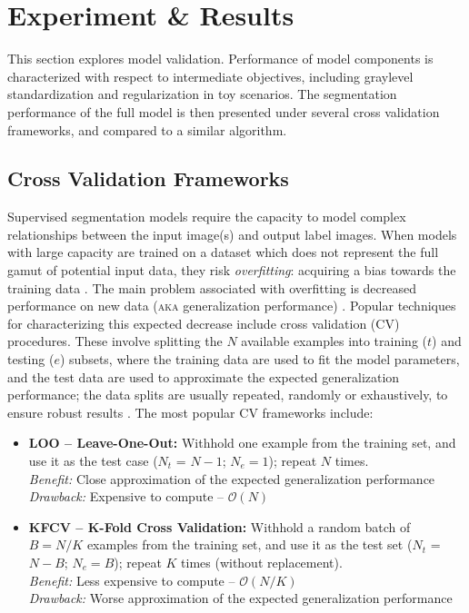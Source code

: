 \chapter{Experiment \& Results}
This section explores model validation.
Performance of model components is characterized with respect to intermediate objectives, including graylevel standardization and regularization in toy scenarios.
The segmentation performance of the full model is then presented under several cross validation frameworks, and compared to a similar algorithm.
\section{Cross Validation Frameworks}\label{s:CVframeworks}
Supervised segmentation models require the capacity to model complex relationships between the input image(s) and output label images.
When models with large capacity are trained on a dataset which does not represent the full gamut of potential input data, they risk \textit{overfitting}: acquiring a bias towards the training data \cite{Hawkins2004}.
The main problem associated with overfitting is decreased performance on new data (\textsc{aka} generalization performance) \cite{Hawkins2004}.
Popular techniques for characterizing this expected decrease include cross validation (CV) procedures.
These involve splitting the $N$ available examples into training ($t$) and testing ($e$) subsets, where the training data are used to fit the model parameters, and the test data are used to approximate the expected generalization performance; the data splits are usually repeated, randomly or exhaustively, to ensure robust results \cite{Arlot2010}.
The most popular CV frameworks include:
\begin{itemize}
  \item \textbf{LOO -- Leave-One-Out:} Withhold one example from the training set, and use it as the test case ($N_t$ = $N-1$; $N_e = 1$); repeat $N$ times.
  \\\textit{Benefit:} Close approximation of the expected generalization performance
  \\\textit{Drawback:} Expensive to compute -- $\mathcal{O}(N)$
  \item \textbf{KFCV -- K-Fold Cross Validation:} Withhold a random batch of $B = N/K$ examples from the training set, and use it as the test set ($N_t$ = $N-B$; $N_e = B$); repeat $K$ times (without replacement).
  \\\textit{Benefit:} Less expensive to compute -- $\mathcal{O}(N/K)$
  \\\textit{Drawback:} Worse approximation of the expected generalization performance
\end{itemize}
